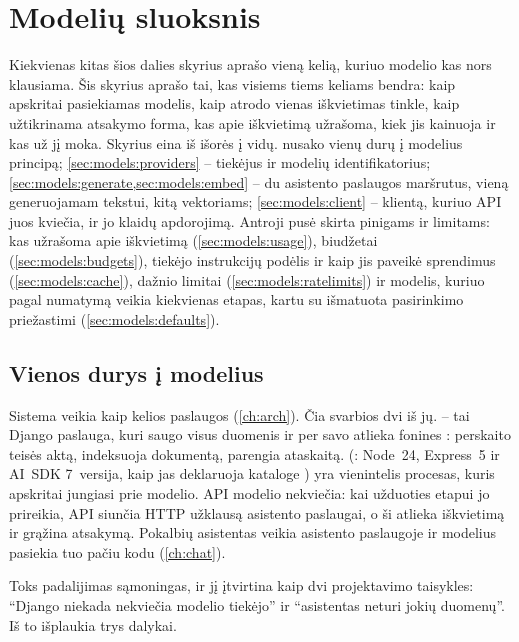 \chapter{Modelių sluoksnis}\label{ch:models}

Kiekvienas kitas šios dalies skyrius aprašo vieną kelią, kuriuo modelio kas nors klausiama. Šis
skyrius aprašo tai, kas visiems tiems keliams bendra: kaip apskritai pasiekiamas modelis, kaip
atrodo vienas iškvietimas tinkle, kaip užtikrinama atsakymo forma, kas apie iškvietimą
užrašoma, kiek jis kainuoja ir kas už jį moka. Skyrius eina iš išorės į vidų.
 nusako vienų durų į modelius principą; \cref{sec:models:providers} --
tiekėjus ir modelių identifikatorius; \cref{sec:models:generate,sec:models:embed} -- du
asistento paslaugos maršrutus, vieną generuojamam tekstui, kitą vektoriams;
\cref{sec:models:client} -- klientą, kuriuo API juos kviečia, ir jo klaidų apdorojimą. Antroji
pusė skirta pinigams ir limitams: kas užrašoma apie iškvietimą (\cref{sec:models:usage}),
biudžetai (\cref{sec:models:budgets}), tiekėjo instrukcijų podėlis ir kaip jis paveikė
sprendimus (\cref{sec:models:cache}), dažnio limitai (\cref{sec:models:ratelimits}) ir
modelis, kuriuo pagal numatymą veikia kiekvienas etapas, kartu su išmatuota pasirinkimo
priežastimi (\cref{sec:models:defaults}).


\section{Vienos durys į modelius}\label{sec:models:door}

Sistema veikia kaip kelios paslaugos (\cref{ch:arch}). Čia svarbios dvi iš jų.
 -- tai Django paslauga, kuri saugo visus duomenis ir per savo  atlieka fonines : perskaito teisės aktą, indeksuoja dokumentą,
parengia ataskaitą.  (: Node~24,
Express~5 ir AI~SDK 7~versija, kaip jas deklaruoja  kataloge
) yra vienintelis procesas, kuris apskritai jungiasi prie modelio. API
modelio nekviečia: kai užduoties etapui jo prireikia, API siunčia HTTP užklausą asistento
paslaugai, o ši atlieka iškvietimą ir grąžina atsakymą. Pokalbių asistentas veikia asistento
paslaugoje ir modelius pasiekia tuo pačiu kodu (\cref{ch:chat}).

Toks padalijimas sąmoningas, ir  jį įtvirtina kaip dvi
projektavimo taisykles: \enquote{Django niekada nekviečia modelio tiekėjo} ir
\enquote{asistentas neturi jokių duomenų}. Iš to išplaukia trys dalykai.

